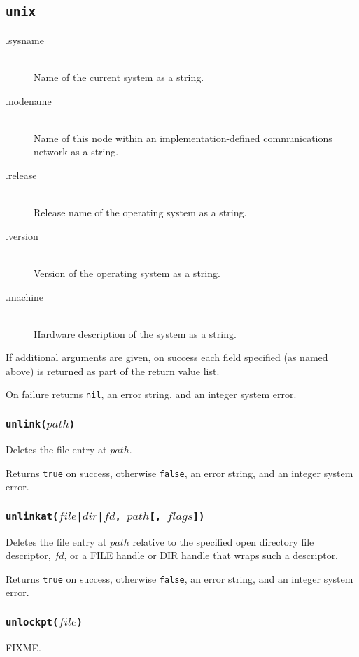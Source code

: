 \documentclass[11pt, oneside]{memoir}
\newcommand*{\true}[0]{\texttt{true}\xspace}
\newcommand*{\false}[0]{\texttt{false}\xspace}
\newcommand*{\nil}[0]{\texttt{nil}\xspace}
\newcommand*{\fn}[1]{\texttt{#1}\xspace}
\newcounter{toccols}
\newenvironment{Module}[1]{
	\subsection{\texttt{#1}}
	\addtocontents{toc}{
		\protect\begin{multicols}{\value{toccols}}
	}
}{
	\addtocontents{toc}{\protect\end{multicols}}
}
\begin{document}
\begin{Module}{unix}
\begin{description}
\item[.sysname] \hfill \\
Name of the current system as a string.
\item[.nodename] \hfill \\
Name of this node within an implementation-defined communications network as a string.
\item[.release] \hfill \\
Release name of the operating system as a string.
\item[.version] \hfill \\
Version of the operating system as a string.
\item[.machine] \hfill \\
Hardware description of the system as a string.
\end{description}

If additional arguments are given, on success each field specified (as named above) is returned as part of the return value list.

On failure returns \nil, an error string, and an integer system error.

\subsubsection[\fn{unlink}]{\fn{unlink($path$)}}

Deletes the file entry at $path$.

Returns \true on success, otherwise \false, an error string, and an integer system error.

\subsubsection[\fn{unlinkat}]{\fn{unlinkat($file$|$dir$|$fd$, $path$[, $flags$])}}

Deletes the file entry at $path$ relative to the specified open directory file descriptor, $fd$, or a FILE handle or DIR handle that wraps such a descriptor.

Returns \true on success, otherwise \false, an error string, and an integer system error.

\subsubsection[\fn{unlockpt}]{\fn{unlockpt($file$)}}

FIXME.


\end{Module}
\end{document}
